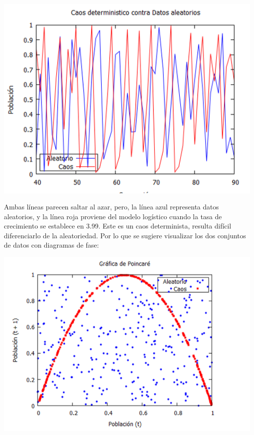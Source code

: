 \documentclass{article}
\begin{document}
\begin{center}
\includegraphics[scale=0.6]{Act110.PNG}
\end{center}

Ambas líneas parecen saltar al azar, pero, la línea azul representa datos aleatorios, y la línea roja proviene del modelo logístico cuando la tasa de crecimiento se establece en 3.99. Este es un caos determinista, resulta difícil diferenciarlo de la aleatoriedad. Por lo que se sugiere visualizar los dos conjuntos de datos con diagramas de fase:

\begin{center}
\includegraphics[scale=0.6]{Act1111.PNG}
\end{center}
\end{document}
